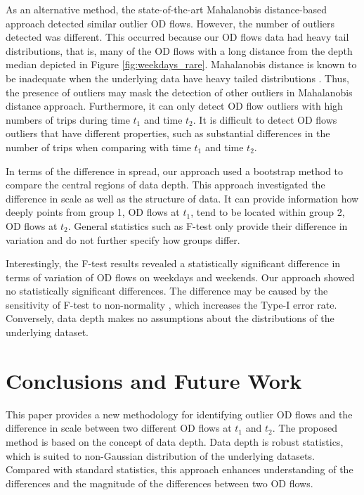 \documentclass[a4paper,UKenglish]{lipics-v2018}
\begin{document}
As an alternative method, the state-of-the-art Mahalanobis distance-based approach detected similar outlier OD flows.
However, the number of outliers detected was different.
This occurred because our OD flows data had heavy tail distributions, that is, many of the OD flows with a long distance from the depth median depicted in Figure \ref{fig:weekdays_rare}. 
Mahalanobis distance is known to be inadequate when the underlying data have heavy tailed distributions \cite{wilcox12Book}. 
Thus, the presence of outliers may mask the detection of other outliers in Mahalanobis distance approach.
Furthermore, it can only detect OD flow outliers with high numbers of trips during time $t_1$ and time $t_2$. 
It is difficult to detect OD flows outliers that have different properties, such as substantial differences in the number of trips when comparing with time $t_1$ and time $t_2$.

In terms of the difference in spread, our approach used a bootstrap method to compare the central regions of data depth.
This approach investigated the difference in scale as well as the structure of data.
It can provide information how deeply points from group 1, OD flows at $t_1$, tend to be located within group 2, OD flows at $t_2$.
General statistics such as F-test only provide their difference in variation and do not further specify how groups differ. 

Interestingly, the F-test results revealed a statistically significant difference in terms of variation of OD flows on weekdays and weekends.
Our approach showed no statistically significant differences.
The difference may be caused by the sensitivity of F-test to non-normality \cite{Field12book}, which increases the Type-I error rate.
Conversely, data depth makes no assumptions about the distributions of the underlying dataset.

%


\section{Conclusions and Future Work}
\label{sec:conclusions}

This paper provides a new methodology for identifying outlier OD flows and the difference in scale between two different OD flows at $t_1$ and $t_2$.
The proposed method is based on the concept of data depth.
Data depth is robust statistics, which is suited to non-Gaussian distribution of the underlying datasets.
Compared with standard statistics, this approach enhances understanding of the differences and the magnitude of the differences between two OD flows. 
\end{document}
